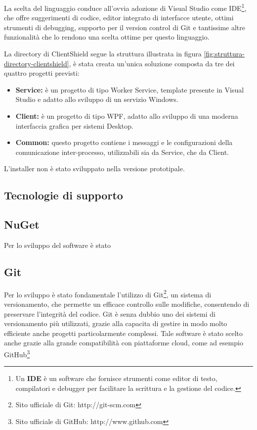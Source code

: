\documentclass[12pt,a4paper,openright,twoside]{book}
\begin{document}
La scelta del linguaggio conduce all'ovvia adozione di Visual Studio come \gls{IDE}\footnote{Un \textbf{\gls{IDE}} è un software che fornisce strumenti come editor di testo, compilatori e debugger per facilitare la scrittura e la gestione del codice.}, che offre suggerimenti di codice, editor integrato di interfacce utente, ottimi strumenti di debugging, supporto per il version control di Git e tantissime altre funzionalità che lo rendono una scelta ottime per questo linguaggio.

La directory di ClientShield segue la struttura illustrata in figura \ref{fig:struttura-directory-clientshield}, è stata creata un'unica soluzione composta da tre dei quattro progetti previsti:
\begin{itemize}
	\item \textbf{Service:}
	è un progetto di tipo Worker Service, template presente in Visual Studio e adatto allo sviluppo di un servizio Windows.
	
	\item \textbf{Client:}
	è un progetto di tipo \gls{WPF}, adatto allo sviluppo di una moderna interfaccia grafica per sistemi Desktop.
	
	\item \textbf{Common:}
	questo progetto contiene i messaggi e le configurazioni della comunicazione inter-processo, utilizzabili sia da Service, che da Client.
\end{itemize}
L'installer non è stato sviluppato nella versione prototipale.

\subsection{Tecnologie di supporto}

\subsection*{NuGet}
Per lo sviluppo del software è stato

\subsection*{Git}

Per lo sviluppo è stato fondamentale l'utilizzo di Git\footnote{Sito ufficiale di Git: http://git-scm.com}, un sistema di versionamento, che permette un efficace controllo sulle modifiche, consentendo di preservare l'integrità del codice.
Git è senza dubbio uno dei sistemi di versionamento più utilizzati, grazie alla capacita di gestire in modo molto efficiente anche progetti particolarmente complessi.
Tale software è stato scelto anche grazie alla grande compatibilità con piattaforme cloud, come ad esempio GitHub\footnote{Sito ufficiale di GitHub: http://www.github.com}
\end{document}
